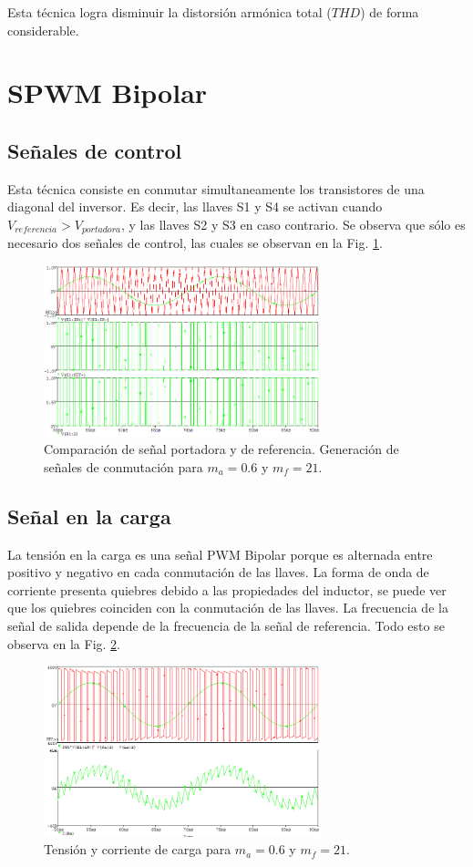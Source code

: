 \documentclass[conference]{IEEEtran}
\begin{document}
Esta técnica logra disminuir la distorsión armónica total ($THD$) de forma considerable.

\section{SPWM Bipolar}
\subsection{Señales de control}
Esta técnica consiste en conmutar simultaneamente los transistores de una diagonal del inversor. Es decir, las llaves S1 y S4 se activan cuando $V_{referencia} > V_{portadora}$, y las llaves S2 y S3 en caso contrario. Se observa que sólo es necesario dos señales de control, las cuales se observan en la Fig. \ref{fig:controlbi}.

\begin{figure}[t]
	\centering
	\includegraphics[width=8cm]{imagenes/bipolar/Control}
	\caption{Comparación de señal portadora y de referencia. Generación de señales de conmutación para $m_a = 0.6$ y $m_f = 21$.}
	\label{fig:controlbi}
\end{figure}
\subsection{Señal en la carga}
La tensión en la carga es una señal PWM Bipolar porque es alternada entre positivo y negativo en cada conmutación de las llaves. La forma de onda de corriente presenta quiebres debido a las propiedades del inductor, se puede ver que los quiebres coinciden con la conmutación de las llaves. La frecuencia de la señal de salida depende de la frecuencia de la señal de referencia. Todo esto se observa en la Fig. \ref{fig:cargabi}.
\begin{figure}[b]
	\centering
	\includegraphics[width=8cm]{imagenes/bipolar/Carga}
	\caption{Tensión y corriente de carga para $m_a = 0.6$ y $m_f = 21$.}
	\label{fig:cargabi}
\end{figure}
\end{document}
